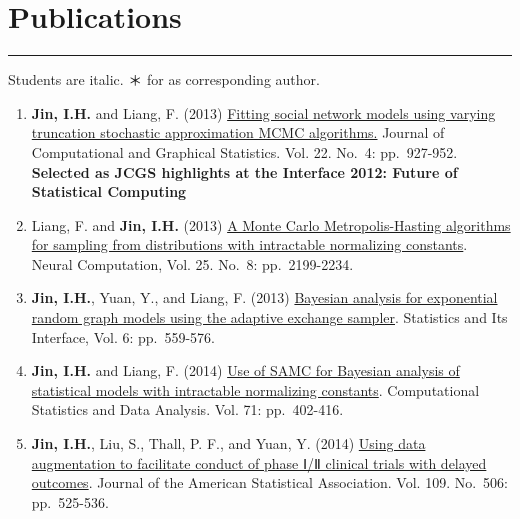 \documentclass[
]{book}
\begin{document}
\hypertarget{publications}{%
\section*{Publications}\label{publications}}

\begin{center}\rule{0.5\linewidth}{0.5pt}\end{center}

Students are italic. ＊ for as corresponding author.

\begin{enumerate}
\def\labelenumi{\arabic{enumi}.}
\item
  \textbf{Jin, I.H.} and Liang, F. (2013) \href{https://www.researchgate.net/publication/241724330_Fitting_Social_Network_Models_Using_Varying_Truncation_Stochastic_Approximation_MCMC_Algorithm}{Fitting social network models using varying truncation stochastic approximation MCMC algorithms.} Journal of Computational and Graphical Statistics. Vol. 22. No.~4: pp.~927-952. \textbf{Selected as JCGS highlights at the Interface 2012: Future of Statistical Computing}
\item
  Liang, F. and \textbf{Jin, I.H.} (2013) \href{https://www.researchgate.net/publication/236264661_A_Monte_Carlo_Metropolis-Hastings_Algorithm_for_Sampling_from_Distributions_with_Intractable_Normalizing_Constants}{A Monte Carlo Metropolis-Hasting algorithms for sampling from distributions with intractable normalizing constants}. Neural Computation, Vol. 25. No.~8: pp.~2199-2234.
\item
  \textbf{Jin, I.H.}, Yuan, Y., and Liang, F. (2013) \href{https://www.researchgate.net/publication/260999601_Bayesian_Analysis_for_Exponential_Random_Graph_Models_Using_the_Adaptive_Exchange_Sampler}{Bayesian analysis for exponential random graph models using the adaptive exchange sampler}. Statistics and Its Interface, Vol. 6: pp.~559-576.
\item
  \textbf{Jin, I.H.} and Liang, F. (2014) \href{https://www.researchgate.net/publication/228682695_Use_of_SAMC_for_Bayesian_Analysis_of_Statistical_Models_with_Intractable_Normalizing_Constants}{Use of SAMC for Bayesian analysis of statistical models with intractable normalizing constants}. Computational Statistics and Data Analysis. Vol. 71: pp.~402-416.
\item
  \textbf{Jin, I.H.}, Liu, S., Thall, P. F., and Yuan, Y. (2014) \href{https://pubmed.ncbi.nlm.nih.gov/25382884/}{Using data augmentation to facilitate conduct of phase Ⅰ/Ⅱ clinical trials with delayed outcomes}. Journal of the American Statistical Association. Vol. 109. No.~506: pp.~525-536.

\end{enumerate}
\end{document}
